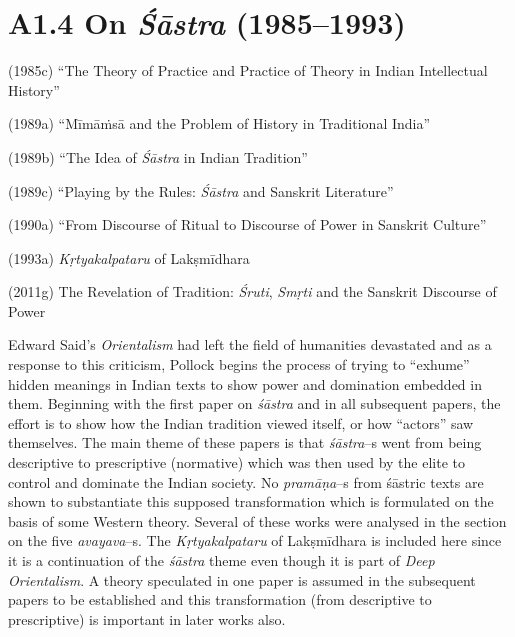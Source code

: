\vspace{-.3cm}

\section*{A1.4 On \textit{Śāstra} (1985–1993)}

(1985c) “The Theory of Practice and Practice of Theory in Indian Intellectual History”

(1989a) “Mīmāṁsā and the Problem of History in Traditional India”

(1989b) “The Idea of \textit{Śāstra} in Indian Tradition”

(1989c) “Playing by the Rules: \textit{Śāstra} and Sanskrit Literature”

\newpage

(1990a) “From Discourse of Ritual to Discourse of Power in Sanskrit Culture”

(1993a) \textit{Kṛtyakalpataru} of Lakṣmīdhara

(2011g) The Revelation of Tradition: \textit{Śruti}, \textit{Smṛti} and the Sanskrit Discourse of Power

Edward Said’s \textit{Orientalism} had left the field of humanities devastated and as a response to this criticism, Pollock begins the process of trying to “exhume” hidden meanings in Indian texts to show power and domination embedded in them. Beginning with the first paper on \textit{śāstra} and in all subsequent papers, the effort is to show how the Indian tradition viewed itself, or how “actors” saw themselves. The main theme of these papers is that \textit{śāstra}–s went from being descriptive to prescriptive (normative) which was then used by the elite to control and dominate the Indian society. No \textit{pramāṇa}–s from śāstric texts are shown to substantiate this supposed transformation which is formulated on the basis of some Western theory. Several of these works were analysed in the section on the five \textit{avayava}–s\break [4.6]. The \textit{Kṛtyakalpataru} of Lakṣmīdhara is included here since it is a continuation of the \textit{śāstra} theme even though it is part of \textit{Deep Orientalism}. A theory speculated in one paper is assumed in the subsequent papers to be established and this transformation (from descriptive to prescriptive) is important in later works also.

